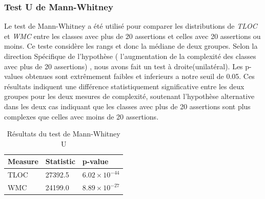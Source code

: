 \documentclass[10pt]{article}
\begin{document}
\subsubsection{Test U de Mann-Whitney }
Le test de Mann-Whitney a été utilisé pour comparer les distributions de \textit{TLOC} et \textit{WMC} entre les classes avec plus de 20 assertions et celles avec 20 assertions ou moins. Ce teste considère les rangs et donc la médiane de deux groupes. Selon la direction Spécifique de l'hypothèse ( l'augmentation de la complexité des classes avec plus de 20 assertions) , nous avons fait un test à droite(unilatéral). Les p-values obtenues sont extrêmement faibles et inferieurs a notre seuil de 0.05. Ces résultats indiquent une différence statistiquement significative entre les deux groupes pour les deux mesures de complexité, soutenant l'hypothèse alternative dans les deux cas indiquant que les classes avec plus de 20 assertions sont plus complexes que celles avec moins de 20 assertions.

\begin{table}[h]
\centering
\begin{tabular}{|l|l|l|}
\hline
\textbf{Measure} & \textbf{Statistic} & \textbf{p-value} \\ \hline
TLOC & 27392.5 & \( 6.02 \times 10^{-44} \) \\ \hline
WMC & 24199.0 & \( 8.89 \times 10^{-27} \) \\ \hline
\end{tabular}
\caption{Résultats du test de Mann-Whitney U}
\label{tab:mann_whitney_results}
\end{table}
\end{document}
